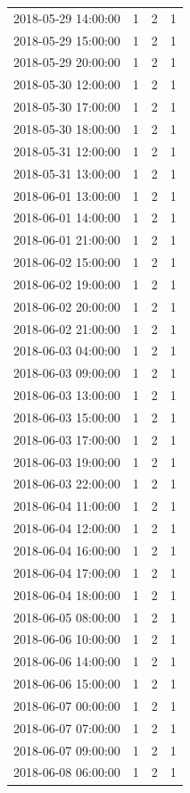 \begin{tabular}{lrrr}
2018-05-29 14:00:00 & 1 & 2 & 1 \\
2018-05-29 15:00:00 & 1 & 2 & 1 \\
2018-05-29 20:00:00 & 1 & 2 & 1 \\
2018-05-30 12:00:00 & 1 & 2 & 1 \\
2018-05-30 17:00:00 & 1 & 2 & 1 \\
2018-05-30 18:00:00 & 1 & 2 & 1 \\
2018-05-31 12:00:00 & 1 & 2 & 1 \\
2018-05-31 13:00:00 & 1 & 2 & 1 \\
2018-06-01 13:00:00 & 1 & 2 & 1 \\
2018-06-01 14:00:00 & 1 & 2 & 1 \\
2018-06-01 21:00:00 & 1 & 2 & 1 \\
2018-06-02 15:00:00 & 1 & 2 & 1 \\
2018-06-02 19:00:00 & 1 & 2 & 1 \\
2018-06-02 20:00:00 & 1 & 2 & 1 \\
2018-06-02 21:00:00 & 1 & 2 & 1 \\
2018-06-03 04:00:00 & 1 & 2 & 1 \\
2018-06-03 09:00:00 & 1 & 2 & 1 \\
2018-06-03 13:00:00 & 1 & 2 & 1 \\
2018-06-03 15:00:00 & 1 & 2 & 1 \\
2018-06-03 17:00:00 & 1 & 2 & 1 \\
2018-06-03 19:00:00 & 1 & 2 & 1 \\
2018-06-03 22:00:00 & 1 & 2 & 1 \\
2018-06-04 11:00:00 & 1 & 2 & 1 \\
2018-06-04 12:00:00 & 1 & 2 & 1 \\
2018-06-04 16:00:00 & 1 & 2 & 1 \\
2018-06-04 17:00:00 & 1 & 2 & 1 \\
2018-06-04 18:00:00 & 1 & 2 & 1 \\
2018-06-05 08:00:00 & 1 & 2 & 1 \\
2018-06-06 10:00:00 & 1 & 2 & 1 \\
2018-06-06 14:00:00 & 1 & 2 & 1 \\
2018-06-06 15:00:00 & 1 & 2 & 1 \\
2018-06-07 00:00:00 & 1 & 2 & 1 \\
2018-06-07 07:00:00 & 1 & 2 & 1 \\
2018-06-07 09:00:00 & 1 & 2 & 1 \\
2018-06-08 06:00:00 & 1 & 2 & 1 \\

\end{tabular}
